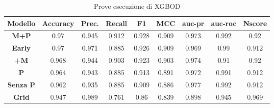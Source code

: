 \begin{table}[h]
    \centering
    \begin{adjustbox}{max width=\textwidth}
        \begin{tabular}{|c|c|c|c|c|c|c|c|c|}
        \hline
        \textbf{Modello} & \textbf{Accuracy} &\textbf{Prec.}  & \textbf{Recall} & \textbf{F1} & \textbf{MCC} & \textbf{auc-pr} & \textbf{auc-roc} & \textbf{Nscore}\\
     \hline
            \textbf{M+P} & 0.97 & 0.945 & 0.912 &0.928  & 0.909 & 0.973 & 0.992 &0.92 \\
            \hline
             \textbf{Early}& 0.97 & 0.971 & 0.885 & 0.926 & 0.909 & 0.969 & 0.99 & 0.912 \\
             \hline
             \textbf{+M}& 0.968 & 0.944 & 0.903 & 0.923 & 0.903 & 0.974 & 0.91 & 0.92 \\
             \hline
             \textbf{P}& 0.964 & 0.943 & 0.885 & 0.913 & 0.891 & 0.972 & 0.991 & 0.912 \\
             \hline
             \textbf{Senza P}& 0.962 & 0.935 & 0.885 & 0.909 & 0.886 & 0.977 & 0.992 & 0.912 \\
             \hline
             \textbf{Grid}& 0.947 & 0.989 & 0.761 & 0.86 & 0.839 & 0.898 & 0.945 & 0.969 \\
             \hline
        \end{tabular}
    \end{adjustbox}
    \label{tab:XGBOD_table}
    \caption{Prove esecuzione di XGBOD}
\end{table}
